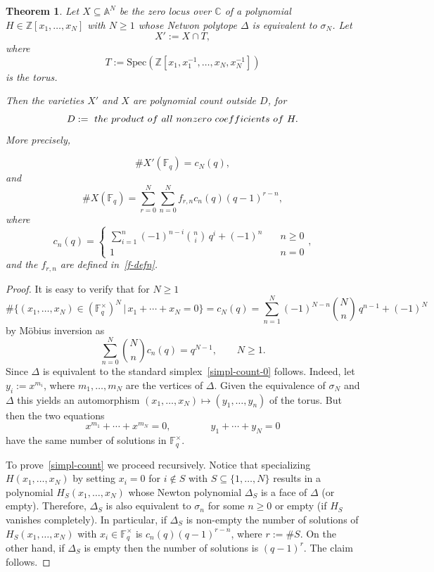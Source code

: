 \documentclass[10pt,a4paper]{amsart}
\newtheorem{theorem}{Theorem}
\newcommand{\A}{\mathbb A}
\newcommand{\C}{{\mathbb C}}
\newcommand{\F}{{\mathbb F}}
\newcommand{\Spec}{\mbox{Spec}}
\newcommand{\Z}{{\mathbb Z}}
\begin{document}
\begin{theorem}
\label{simpl-count-thm}
  Let $X\subseteq \A^N$ be the zero locus over $\C$ of a polynomial
  $H\in \Z[x_1,\ldots,x_N]$ with $N\geq 1$ whose Netwon polytope $\Delta$
  is equivalent to $\sigma_N$. Let
$$
X':=X\cap T,
$$
where 
$$
T:=\Spec(\Z[x_1,x_1^{-1},\ldots,x_N,x_N^{-1}])
$$
is the torus. 

Then the varieties $X'$ and  $X$ are polynomial count outside $D$, for
$$D:={\rm\ the \ product\ of \ all\  nonzero\  coefficients\ of\ }H.$$
More
precisely, 

\begin{equation}
\label{simpl-count-0}
\#X'(\F_q)= c_N(q), 
\end{equation}
and
\begin{equation}
\label{simpl-count}
\#X(\F_q)=\sum_{r=0}^N\sum_{n=0}^N
f_{r,n}c_n(q)(q-1)^{r-n},
\end{equation}
where
$$
c_n(q)=
\begin{cases}
\sum_{i=1}^n(-1)^{n-i}\binom{n}{i}\, q^i + (-1)^n&\quad n\geq 0\\
1 & \quad n=0
\end{cases},
$$
 and the $f_{r,n}$ are defined in~\eqref{f-defn}.
\end{theorem}

\begin{proof}
  It is easy to verify that for $N\ge 1$
$$
\#\{(x_1,\ldots,x_N)\in (\F_q^\times)^N \,|\,
x_1+\cdots
+x_N=0\}= c_N(q)=\sum_{n=1}^N(-1)^{N-n}\binom Nn\, q^{n-1} + (-1)^N
$$
by M\"obius inversion as
$$
\sum_{n=0}^N\binom N nc_n(q)=q^{N-1},\qquad N\geq 1.
$$
Since $\Delta$ is equivalent to the standard
simplex~\eqref{simpl-count-0} follows. Indeed, 
let $y_i:=x^{m_i}$, where $m_1,\ldots,m_N$ are
the vertices of $\Delta$. Given the equivalence of $\sigma_N$ and
$\Delta$ this yields an automorphism $(x_1,\ldots,x_N)\mapsto
(y_1,\ldots,y_n)$ of the torus. But then the two equations
$$
x^{m_1}+\cdots+x^{m_N}=0, \qquad \qquad y_1+\cdots+y_N=0
$$
have the same number of solutions in $\F_q^\times$.

To prove~\eqref{simpl-count} we proceed recursively. Notice that
specializing $H(x_1,\ldots,x_N)$ by setting $x_i=0$ for $i\notin S$
with $S\subseteq \{1,\ldots,N\}$ results in a polynomial
$H_S(x_1,\ldots,x_N)$ whose Newton polynomial $\Delta_S$ is a face of
$\Delta$ (or empty). Therefore, $\Delta_S$ is also equivalent to
$\sigma_n$ for some $n\geq 0$ or empty (if $H_S$ vanishes
completely). In particular, if $\Delta_S$ is non-empty the number of
solutions of $H_S(x_1,\ldots,x_N)$ with $x_i\in \F_q^\times$ is
$c_n(q)(q-1)^{r-n}$, where $r:=\#S$. On the other hand, if $\Delta_S$
is empty then the number of solutions is $(q-1)^r$. The claim follows.
\end{proof}
\end{document}
